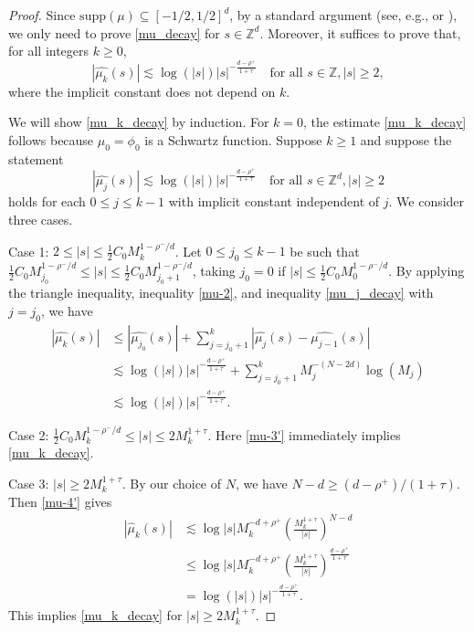 \documentclass{amsart}
\numberwithin{equation}{section}
\theoremstyle{definition}
\theoremstyle{definition}
\def\ZZ{\mathbb{Z}}
\def\supp{\mathrm{supp}}
\begin{document}
\begin{proof}
Since $\supp(\mu) \subseteq [-1/2,1/2]^d$, by a standard argument (see, e.g., \cite[Lemma 1, p.252-253]{kahane-book} or \cite[Lemma 9.A.4, p.69]{wolff-book}), we only need to prove \eqref{mu_decay} for $s \in \ZZ^d$. 
Moreover, it 
suffices to prove  that, for all integers $k \geq 0$, 
\begin{equation}\label{mu_k_decay}
|\widehat{\mu_k}(s) | \lesssim 
\log(|s|)|s|^{-\frac{d-\rho^+}{1 + \tau}} 
\quad \text{for all $s \in \ZZ, |s| \geq 2$}
, 
\end{equation}
where the implicit constant  does not depend on $k$. 


We will show \eqref{mu_k_decay} by induction. For $k = 0$, the estimate \eqref{mu_k_decay} follows 
because $\mu_0 = \phi_0$ is a Schwartz function. Suppose $k \geq 1$ and suppose the statement \begin{equation}\label{mu_j_decay}
|\widehat{\mu_j}(s) | \lesssim 
\log(|s|)|s|^{-\frac{d-\rho^+}{1 + \tau}} \quad \text{for all $s \in \ZZ^d, |s| \geq 2$} 
\end{equation} holds for each $0 \leq j \leq k-1$ 
with implicit  constant independent of $j$. We consider three cases. 

Case 1: $2 \leq |s| \leq 
\frac{1}{2}C_0 M_k^{1-\rho^{-}/d}$. 
Let $0 \leq j_0 \leq k-1$ be such that 
$
\frac{1}{2}C_0 M_{j_0}^{1-\rho^{-}/d} 
\leq |s| \leq 
\frac{1}{2}C_0 M_{j_0+1}^{1-\rho^{-}/d}$,
taking $j_0 = 0$ if 
$|s| \leq 
\frac{1}{2}C_0 M_{0}^{1-\rho^{-}/d}$. 
By applying the triangle inequality, inequality \eqref{mu-2}, and inequality \eqref{mu_j_decay} with $j = j_0$, we have
\begin{align*}
|\widehat{\mu_k}(s)| & \leq |\widehat{\mu_{j_0}}(s)| + \sum_{j = j_0 + 1}^k |\widehat{\mu_j}(s) - \widehat{\mu_{j-1}}(s)| \\
& \lesssim 
\log(|s|)
|s|^{-\frac{d-\rho^+}{1 + \tau}}
+ \sum_{j=j_0 + 1}^k 
M_j^{-(N - 2d)}\log(M_j)
\\
& \lesssim 
\log(|s|)
|s|^{-\frac{d-\rho^+}{1 + \tau}}. 
\end{align*}

Case 2:  
$\frac{1}{2}C_0 M_{k}^{1-\rho^{-}/d} 
\leq |s| \leq 2M_k^{1+\tau}$.  Here \eqref{mu-3'} immediately implies \eqref{mu_k_decay}. 

Case 3: $|s| \geq 2M_k^{1+\tau}$. By our choice of $N$, we have 
$N-d \geq (d-\rho^+)/(1+\tau)$. Then \eqref{mu-4'} gives 
\begin{align*}
|\widehat{\mu}_k(s)| 
&\lesssim 
\log |s| 
M_k^{-d+\rho^+}\left( \frac{M_k^{1+\tau}}{|s|} \right)^{N-d}
\\
&\leq 
\log |s| 
M_k^{-d+\rho^+}\left( \frac{M_k^{1+\tau}}{|s|} \right)^{\frac{d-\rho^+}{1+\tau}}
\\
&=
\log(|s|)
|s|^{-\frac{d-\rho^+}{1+\tau}}.
\end{align*}
This implies \eqref{mu_k_decay} for $|s| \geq 2M_k^{1+\tau}$. 
\end{proof}
\end{document}
